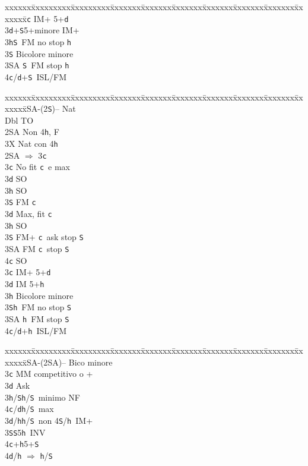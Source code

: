 \documentclass[a4paper,italian]{article}
\newcommand{\BS}{\small{\texttt{S}}}
\newcommand{\BC}{\small{\texttt{c}}}
\newcommand{\BD}{\small{\texttt{d}}}
\newcommand{\BH}{\small{\texttt{h}}}
\newenvironment{bidtable}
{\begin{tabbing}

    xxxxxx\=xxxxxxxxx\=xxxxxxxxx\=xxxxxxx\=xxxxxxx\=xxxxxxx\=xxxxxxx\=xxxxxxx\=xxxxxxx\=xxxxxxx\=\kill}
{\end{tabbing} }%
\begin{document}
\begin{multicols}{2}
\begin{bidtable}
        3\BC \> IM+ 5+\BD \\
        3\BD {}+\BS 5+minore IM+\\
        3\BH {}\BS\ FM no stop \BH \\
        3\BS \> Bicolore minore\\
        3\small{SA} \BS\ FM stop \BH \\
        4\BC/\BD {}+\BS\ ISL/FM\-
    \end{bidtable}
    \begin{bidtable}
        1\small{SA}-(2\BS)-- \> \> Nat\+\\
        Dbl \> TO\+\\
        2\small{SA} \> Non 4\BH, F\\
        3X \> Nat con 4\BH\-\\
        2\small{SA} \> $\Rightarrow$ 3\BC \+\\
        3\BC \> No fit \BC\ e max\+\\
        3\BD \> SO\\
        3\BH \> SO\\
        3\BS \> FM \BC \-\\
        3\BD \> Max, fit \BC \+\\
        3\BH \> SO\\
        3\BS \> FM+ \BC\ ask stop \BS \\
        3\small{SA} \> FM \BC\ stop \BS \\
        4\BC \> SO\-\-\\
        3\BC \> IM+ 5+\BD \\
        3\BD \> IM 5+\BH \\
        3\BH \> Bicolore minore\\
        3\BS {}\BH\ FM no stop \BS \\
        3\small{SA} \BH\ FM stop \BS \\
        4\BC/\BD {}+\BH\ ISL/FM\-
    \end{bidtable}
    \begin{bidtable}
        1\small{SA}-(2\small{SA})-- \>\> Bico minore\+\\
        3\BC {} MM competitivo o +\+\\
        3\BD \> Ask\+\\
        3\BH/\BS {}\BH /\BS\ minimo NF\\
        4\BC/\BD {}\BH /\BS\ max\-\-\\
        3\BD/\BH {}\BH /\BS\ non 4\BS/\BH\ IM+\\
        3\BS {}\BS5\BH\ INV\\
        4\BC {}+\BH 5+\BS \\
        4\BD/\BH \> $\Rightarrow$ \BH /\BS \-
    \end{bidtable}
    \vfill\null
    \columnbreak


\end{multicols}
\end{document}
